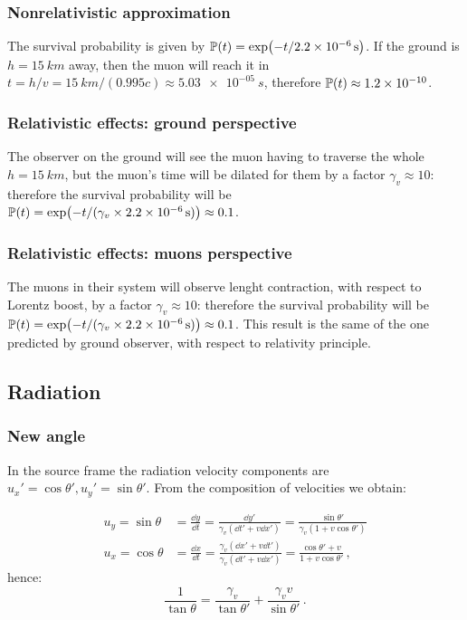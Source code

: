 \documentclass[main.tex]{subfiles}
\begin{document}
\subsubsection{Nonrelativistic approximation}

The survival probability is given by \(\mathbb{P} (t) = \exp(-t/ \SI{2.2e-6}{s})\). If the ground is \( h =\SI{15}{km} \) away, then the muon will reach it in \(t = h/v = \SI{15}{km} / (0.995c) \approx \SI{5.03e-05}{s}\), therefore \(\mathbb{P}(t) \approx \num{1.2e-10} \).

\subsubsection{Relativistic effects: ground perspective}

The observer on the ground will see the muon having to traverse the whole \(h = \SI{15}{km} \), but the muon's time will be dilated for them by a factor \(\gamma_v \approx 10\): therefore the survival probability
will be \(\mathbb{P}(t) = \exp(- t / (\gamma_v \times \SI{2.2e-6}{s})) \approx 0.1\).


\subsubsection{Relativistic effects: muons perspective}

The muons in their system will observe lenght contraction, with respect to Lorentz boost, by a factor \(\gamma_v \approx 10\): therefore the survival probability
will be \(\mathbb{P}(t) = \exp(- t / (\gamma_v \times \SI{2.2e-6}{s})) \approx 0.1\). This result is the same of the one predicted by ground observer, with respect to relativity principle.


\subsection{Radiation}

\subsubsection{New angle}
In the source frame the radiation velocity components are \( u_x' = \cos\theta', u_y' = \sin\theta' \). From the composition of velocities we obtain:

\begin{subequations}
\begin{align}
    u_y = \sin\theta &= \frac{\dd{y}}{\dd{t}} = \frac{\dd{y'}}{\gamma_v(\dd{t'} + v\dd{x'})} = \frac{\sin\theta'}{\gamma_v(1+v\cos\theta')} \\
    u_x = \cos\theta &= \frac{\dd{x}}{\dd{t}} = \frac{\gamma_v(\dd{x'} + v\dd{t'})}{\gamma_v(\dd{t'} + v\dd{x'})} = \frac{\cos\theta' + v}{1+v\cos\theta'}\,,
\end{align}
\end{subequations}
%
hence:
%
\begin{equation}
\frac{1}{\tan\theta} = \frac{\gamma_v}{\tan\theta'} + \frac{\gamma_vv}{\sin\theta'} \,.
\end{equation}
\end{document}
